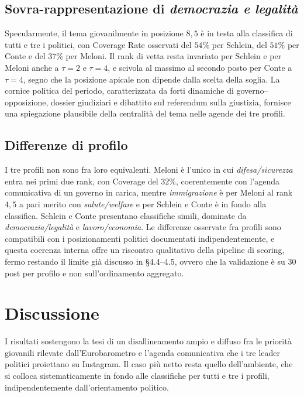 \documentclass[11pt, a4paper]{article}
\begin{document}
\subsection{Sovra-rappresentazione di \emph{democrazia e legalit\`a}}

Specularmente, il tema giovanilmente in posizione $8{,}5$ \`e in testa
alla classifica di tutti e tre i politici, con Coverage Rate osservati
del $54\%$ per Schlein, del $51\%$ per Conte e del $37\%$ per Meloni.
Il rank di vetta resta invariato per Schlein e per Meloni anche a
$\tau=2$ e $\tau=4$, e scivola al massimo al secondo posto per Conte
a $\tau=4$, segno che la posizione apicale non dipende dalla scelta
della soglia. La cornice politica del periodo, caratterizzata da
forti dinamiche di governo--opposizione, dossier giudiziari e
dibattito sul referendum sulla giustizia, fornisce una
spiegazione plausibile della centralit\`a del tema nelle agende dei
tre profili.

\subsection{Differenze di profilo}

I tre profili non sono fra loro equivalenti. Meloni \`e l'unico in cui
\emph{difesa/sicurezza} entra nei primi due rank, con Coverage del
$32\%$, coerentemente con l'agenda comunicativa di un governo in
carica, mentre \emph{immigrazione} \`e per Meloni al rank $4{,}5$ a
pari merito con \emph{salute/welfare} e per Schlein e Conte \`e in
fondo alla classifica. Schlein e Conte presentano classifiche simili,
dominate da \emph{democrazia/legalit\`a} e \emph{lavoro/economia}.
Le differenze osservate fra profili sono compatibili con i
posizionamenti politici documentati indipendentemente, e questa
coerenza interna offre un riscontro qualitativo della pipeline di
scoring, fermo restando il limite gi\`a discusso in \S 4.4--4.5,
ovvero che la validazione \`e su $30$ post per profilo e non
sull'ordinamento aggregato.

\section{Discussione}

I risultati sostengono la tesi di un disallineamento ampio e diffuso
fra le priorit\`a giovanili rilevate dall'Eurobarometro e l'agenda
comunicativa che i tre leader politici proiettano su Instagram. Il
caso pi\`u netto resta quello dell'ambiente, che si colloca
sistematicamente in fondo alle classifiche per tutti e tre i profili,
indipendentemente dall'orientamento politico.
\end{document}
